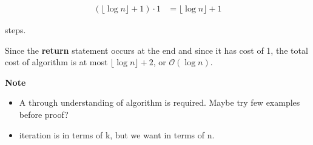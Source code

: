\documentclass[12pt]{article}
\begin{document}
\begin{enumerate}[a.]
    \begin{align}
        (\lfloor \log n \rfloor + 1) \cdot 1 &= \lfloor \log n \rfloor + 1
    \end{align}

    steps.

    \bigskip

    Since the \textbf{return} statement occurs at the end and since it has cost of 1,
    the total cost of algorithm is at most $\lfloor \log n \rfloor + 2$, or $\mathcal{O}(\log n)$.

    \textbf{Note}

    \begin{itemize}
        \item A through understanding of algorithm is required. Maybe try few examples before proof?
        \item iteration is in terms of k, but we want in terms of n.
    \end{itemize}


\end{enumerate}
\end{document}
